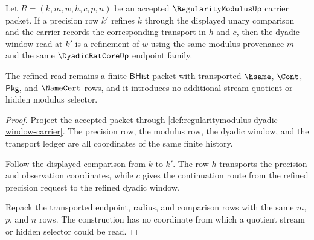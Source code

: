 \begin{theorem}
\label{thm:regularitymodulus-window-monotonicity}
Let $R=(k,m,w,h,c,p,n)$ be an accepted $\RegularityModulusUp$ carrier packet.
If a precision row $k'$ refines $k$ through the displayed unary comparison
and the carrier records the corresponding transport in $h$ and $c$, then the
dyadic window read at $k'$ is a refinement of $w$ using the same modulus
provenance $m$ and the same $\DyadicRatCoreUp$ endpoint family.

The refined read remains a finite $\mathsf{BHist}$ packet with transported
$\hsame$, $\Cont$, $\mathsf{Pkg}$, and $\NameCert$ rows, and it introduces no
additional stream quotient or hidden modulus selector.
\end{theorem}
\begin{proof}
Project the accepted packet through
\autoref{def:regularitymodulus-dyadic-window-carrier}. The precision row, the
modulus row, the dyadic window, and the transport ledger are all coordinates
of the same finite history.

Follow the displayed comparison from $k$ to $k'$. The row $h$ transports the
precision and observation coordinates, while $c$ gives the continuation route
from the refined precision request to the refined dyadic window.

Repack the transported endpoint, radius, and comparison rows with the same
$m$, $p$, and $n$ rows. The construction has no coordinate from which a
quotient stream or hidden selector could be read.
\end{proof}

